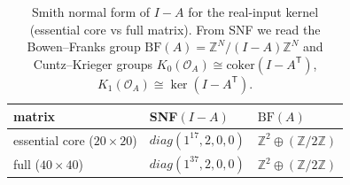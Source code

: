 \begin{table}[H]
\centering
\scriptsize
\setlength{\tabcolsep}{6pt}
\caption{Smith normal form of $I-A$ for the real-input kernel (essential core vs full matrix). From SNF we read the Bowen--Franks group $\mathrm{BF}(A)=\mathbb Z^N/(I-A)\mathbb Z^N$ and Cuntz--Krieger groups $K_0(\mathcal O_A)\cong\mathrm{coker}(I-A^\mathsf T)$, $K_1(\mathcal O_A)\cong\ker(I-A^\mathsf T)$.}
\label{tab:real_input_40_bf_ktheory}
\begin{tabular}{l l l}
\toprule
matrix & SNF$(I-A)$ & $\mathrm{BF}(A)$\\
\midrule
essential core ($20\times20$) & $diag(1^{17},2,0,0)$ & $\mathbb Z^2\oplus (\mathbb Z/2\mathbb Z)$\\
full ($40\times40$) & $diag(1^{37},2,0,0)$ & $\mathbb Z^2\oplus (\mathbb Z/2\mathbb Z)$\\
\bottomrule
\end{tabular}
\end{table}
